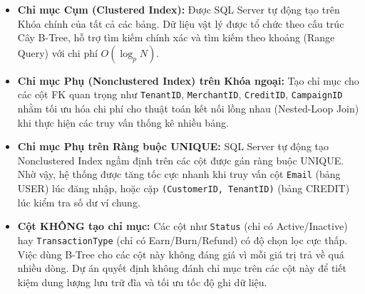 \begin{itemize}
    \item \textbf{Chỉ mục Cụm (Clustered Index):} Được SQL Server tự động tạo trên Khóa chính của tất cả các bảng. Dữ liệu vật lý được tổ chức theo cấu trúc Cây B-Tree, hỗ trợ tìm kiếm chính xác và tìm kiếm theo khoảng (Range Query) với chi phí $O(\log_p N)$.
    
    \item \textbf{Chỉ mục Phụ (Nonclustered Index) trên Khóa ngoại:} Tạo chỉ mục cho các cột FK quan trọng như \texttt{TenantID}, \texttt{MerchantID}, \texttt{CreditID}, \texttt{CampaignID} nhằm tối ưu hóa chi phí cho thuật toán kết nối lồng nhau (Nested-Loop Join) khi thực hiện các truy vấn thống kê nhiều bảng.
    
    \item \textbf{Chỉ mục Phụ trên Ràng buộc UNIQUE:} SQL Server tự động tạo Nonclustered Index ngầm định trên các cột được gán ràng buộc UNIQUE. Nhờ vậy, hệ thống được tăng tốc cực nhanh khi truy vấn cột \texttt{Email} (bảng USER) lúc đăng nhập, hoặc cặp \texttt{(CustomerID, TenantID)} (bảng CREDIT) lúc kiểm tra số dư ví chung.
    
    \item \textbf{Cột KHÔNG tạo chỉ mục:} Các cột như \texttt{Status} (chỉ có Active/Inactive) hay \texttt{TransactionType} (chỉ có Earn/Burn/Refund) có độ chọn lọc cực thấp. Việc dùng B-Tree cho các cột này không đáng giá vì mỗi giá trị trả về quá nhiều dòng. Dự án quyết định không đánh chỉ mục trên các cột này để tiết kiệm dung lượng lưu trữ đĩa và tối ưu tốc độ ghi dữ liệu.
\end{itemize}